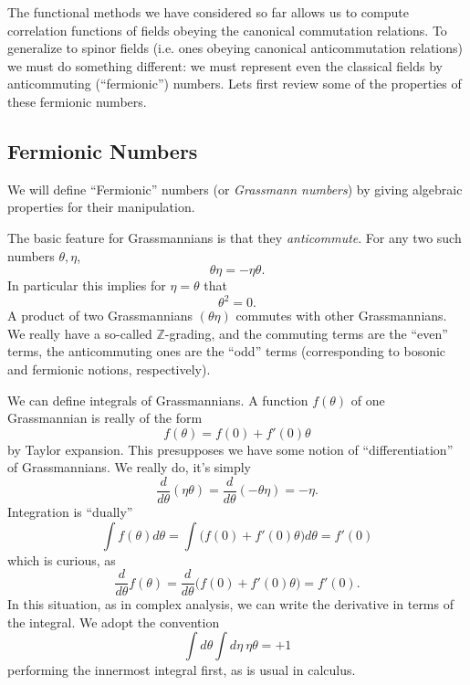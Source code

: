 
The functional methods we have considered so far allows us to
compute correlation functions of fields obeying the canonical
commutation relations. To generalize to spinor fields (i.e. ones
obeying canonical anticommutation relations) we must do something
different: we must represent even the classical fields by
anticommuting (``fermionic'') numbers. Lets first review some of
the properties of these fermionic numbers.

\subsection{Fermionic Numbers}

We will define ``Fermionic'' numbers (or \emph{Grassmann numbers}) 
by giving algebraic properties for their manipulation. 

The basic feature for Grassmannians is that they
\emph{anticommute}. For any two such numbers $\theta,\eta$,
\begin{equation}%
\theta\eta=-\eta\theta.
\end{equation}
In particular this implies for $\eta=\theta$ that
\begin{equation}%
\theta^{2} = 0.
\end{equation}
A product of two Grassmannians $(\theta\eta)$ commutes with other
Grassmannians. We really have a so-called $\mathbb{Z}$-grading,
and the commuting terms are the ``even'' terms, the anticommuting
ones are the ``odd'' terms (corresponding to bosonic and
fermionic notions, respectively).

We can define integrals of Grassmannians. A function $f(\theta)$
of one Grassmannian is really of the form
\begin{equation}%
f(\theta)=f(0)+f'(0)\theta
\end{equation}
by Taylor expansion. This presupposes we have some notion of
``differentiation'' of Grassmannians. We really do, it's simply
\begin{equation}%
\frac{d}{d\theta}(\eta\theta)=\frac{d}{d\theta}(-\theta\eta)=-\eta.
\end{equation}
Integration is ``dually''
\begin{equation}%
\int f(\theta)d\theta = \int \Big(f(0)+f'(0)\theta\Big)d\theta = f'(0)
\end{equation}
which is curious, as
\begin{equation}%
\frac{d}{d\theta}f(\theta) =
\frac{d}{d\theta}\Big(f(0)+f'(0)\theta\Big) = f'(0).
\end{equation}
In this situation, as in complex analysis, we can write the
derivative in terms of the integral. We adopt the convention
\begin{equation}%
\int d\theta\int d\eta ~\eta\theta = +1
\end{equation}
performing the innermost integral first, as is usual in calculus.

